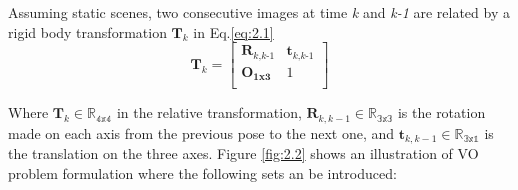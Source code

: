 Assuming static scenes, two consecutive images at time \textit{k} and \textit{k-1} are related by a rigid body transformation $\mathbf{T_\textit{k}}$ in Eq.\ref{eq:2.1}
\begin{equation} \label{eq:2.1}
    \mathbf{T_\textit{k}} = \begin{bmatrix}
        \mathbf{R_\textit{k,k-1}} & \mathbf{t_\textit{k,k-1}} \\
        \mathbf{O_\text{1x3}}     & 1                         \\
    \end{bmatrix}
\end{equation}

Where $\mathbf{T_\mathit{k}} \in \mathbb{R_\text{4x4}}$ in the relative transformation, $\mathbf{R_\mathit{k,k-1}}\in\mathbb{R_\text{3x3}}$ is the rotation made on each axis from the previous pose to the next one, and $\mathbf{t_\mathit{k,k-1}}\in\mathbb{R_\text{3x1}}$ is the translation on the three axes. Figure \ref{fig:2.2} shows an illustration of VO problem formulation where the following sets an be introduced:

